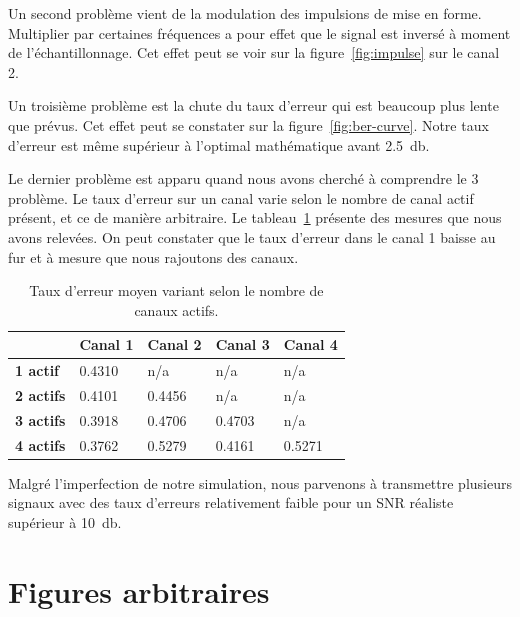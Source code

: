 \documentclass[10pt, oneside, a4paper]{article}
\begin{document}
Un second problème vient de la modulation des impulsions de mise en forme.
Multiplier par certaines fréquences a pour effet que le signal est inversé à moment de l'échantillonnage.
Cet effet peut se voir sur la figure~\ref{fig:impulse} sur le canal 2.

Un troisième problème est la chute du taux d'erreur qui est beaucoup plus lente que prévus.
Cet effet peut se constater sur la figure~\ref{fig:ber-curve}.
Notre taux d'erreur est même supérieur à l'optimal mathématique avant \SI{2.5}{\decibel}.

Le dernier problème est apparu quand nous avons cherché à comprendre le 3 problème.
Le taux d'erreur sur un canal varie selon le nombre de canal actif présent, et ce de manière arbitraire.
Le tableau~\ref{tab:ber-per-channel} présente des mesures que nous avons relevées.
On peut constater que le taux d'erreur dans le canal 1 baisse au fur et à mesure que nous rajoutons des canaux.

\begin{table}[!ht]
    \centering
    \begin{tabular}{l|llll}
    & \bf Canal 1 & \bf Canal 2 & \bf Canal 3 & \bf Canal 4\\
    \hline
    \bf 1 actif  & 0.4310 & n/a    & n/a    & n/a\\
    \bf 2 actifs & 0.4101 & 0.4456 & n/a    & n/a\\
    \bf 3 actifs & 0.3918 & 0.4706 & 0.4703 & n/a\\
    \bf 4 actifs & 0.3762 & 0.5279 & 0.4161 & 0.5271
    \end{tabular}
    \caption{Taux d'erreur moyen variant selon le nombre de canaux actifs.}
    \label{tab:ber-per-channel}
\end{table}

Malgré l'imperfection de notre simulation, nous parvenons à transmettre plusieurs signaux avec des taux d'erreurs relativement faible pour un SNR réaliste supérieur à \SI{10}{\decibel}.

\appendix
\clearpage

\section{Figures arbitraires}
\label{sec:uncommented-figure}
\end{document}
